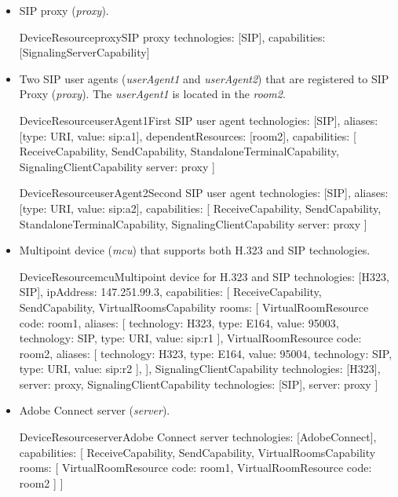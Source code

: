 \begin{itemize}
\item SIP proxy (\emph{proxy}).

\begin{EntityExample}{DeviceResource}{proxy}{SIP proxy}
technologies: [SIP], 
capabilities: [SignalingServerCapability]
\end{EntityExample}

\item Two SIP user agents (\emph{userAgent1} and \emph{userAgent2}) that are
  registered to SIP Proxy (\emph{proxy}). The \emph{userAgent1} is located in
  the \emph{room2}.
  
\begin{EntityExample}{DeviceResource}{userAgent1}{First SIP user agent}
technologies: [SIP],
aliases: [{type: URI, value: sip:a1}],
dependentResources: [room2],
capabilities: [
  ReceiveCapability, SendCapability,
  StandaloneTerminalCapability,
  SignalingClientCapability {server: proxy}
]
\end{EntityExample}

\begin{EntityExample}{DeviceResource}{userAgent2}{Second SIP user agent}
technologies: [SIP],
aliases: [{type: URI, value: sip:a2}],
capabilities: [
  ReceiveCapability, SendCapability,
  StandaloneTerminalCapability,
  SignalingClientCapability {server: proxy}
]
\end{EntityExample}

\item Multipoint device (\emph{mcu}) that supports both H.323 and SIP 
  technologies.
  
\begin{EntityExample}{DeviceResource}{mcu}{Multipoint device for H.323 and SIP}
technologies: [H323, SIP], 
ipAddress: 147.251.99.3,
capabilities: [
  ReceiveCapability, SendCapability,
  VirtualRoomsCapability {rooms: [
    VirtualRoomResource {code: room1, aliases: [
      {technology: H323, type: E164, value: 95003},
      {technology: SIP, type: URI, value: sip:r1}
    ]},
    VirtualRoomResource {code: room2, aliases: [
      {technology: H323, type: E164, value: 95004},
      {technology: SIP, type: URI, value: sip:r2}
    ]},
  ]},
  SignalingClientCapability {technologies: [H323], server: proxy},
  SignalingClientCapability {technologies: [SIP], server: proxy}
]
\end{EntityExample}

\item Adobe Connect server (\emph{server}).

\begin{EntityExample}{DeviceResource}{server}{Adobe Connect server}
technologies: [AdobeConnect],
capabilities: [
  ReceiveCapability, SendCapability,
  VirtualRoomsCapability {rooms: [ 
    VirtualRoomResource {code: room1}, 
    VirtualRoomResource {code: room2}
  ]}
]
\end{EntityExample}


\end{itemize}

